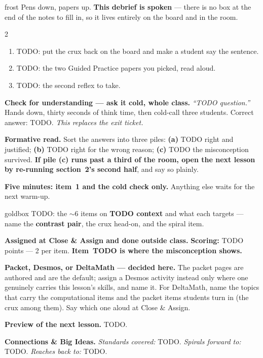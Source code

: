\documentclass[10pt]{article}
\begin{document}
\boxguard[24]
\begin{skillbox}{frost}
Pens down, papers up. \textbf{This debrief is spoken} --- there is no box at the end of the
notes to fill in, so it lives entirely on the board and in the room.
\begin{multicols}{2}
\begin{enumerate}[leftmargin=1.3em, nosep, itemsep=3pt]
  \item TODO: put the crux back on the board and make a student say the sentence.
  \item TODO: the two Guided Practice papers you picked, read aloud.
  \item TODO: the second reflex to take.
\end{enumerate}
\columnbreak
\textbf{Check for understanding --- ask it cold, whole class.} \emph{``TODO question.''} Hands
down, thirty seconds of think time, then cold-call three students. Correct answer: TODO.
\emph{This replaces the exit ticket.}

\textbf{Formative read.} Sort the answers into three piles: \textbf{(a)} TODO right and
justified; \textbf{(b)} TODO right for the wrong reason; \textbf{(c)} TODO the misconception
survived. \textbf{If pile (c) runs past a third of the room, open the next lesson by re-running
section~2's second half}, and say so plainly.

\textbf{Five minutes: item~1 and the cold check only.} Anything else waits for the next warm-up.
\end{multicols}
\end{skillbox}

\boxguard
\begin{skillbox}{goldbox}
TODO: the $\sim$6 items on \textbf{TODO context} and what each targets --- name the
\textbf{contrast pair}, the crux head-on, and the spiral item.

\textbf{Assigned at Close \& Assign and done outside class.} \textbf{Scoring:}
TODO points --- 2 per item. \textbf{Item~TODO is where the misconception shows.}

\textbf{Packet, Desmos, or DeltaMath --- decided here.} The packet pages are authored and are the
default; assign a Desmos activity instead only where one genuinely carries this lesson's skills,
and name it. For DeltaMath, name the topics that carry the computational items and the packet
items students turn in (the crux among them). Say which one aloud at Close \& Assign.

\textbf{Preview of the next lesson.} TODO.

\textbf{Connections \& Big Ideas.} \textit{Standards covered:} TODO. \textit{Spirals forward
to:} TODO. \textit{Reaches back to:} TODO.
\end{skillbox}
\end{document}
